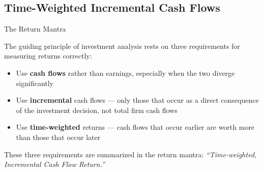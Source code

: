 \documentclass[10pt]{article}
\begin{document}
  \subsection{Time-Weighted Incremental Cash Flows}

    \begin{core}{The Return Mantra}

      The guiding principle of investment analysis rests on three requirements for measuring returns correctly:

      \begin{itemize}

        \item Use \textbf{cash flows} rather than earnings, especially when the two diverge significantly

        \item Use \textbf{incremental} cash flows — only those that occur as a direct consequence of the investment decision, not total firm cash flows

        \item Use \textbf{time-weighted} returns — cash flows that occur earlier are worth more than those that occur later

      \end{itemize}

      These three requirements are summarized in the return mantra: \textit{``Time-weighted, Incremental Cash Flow Return.''}


    \end{core}
\end{document}
